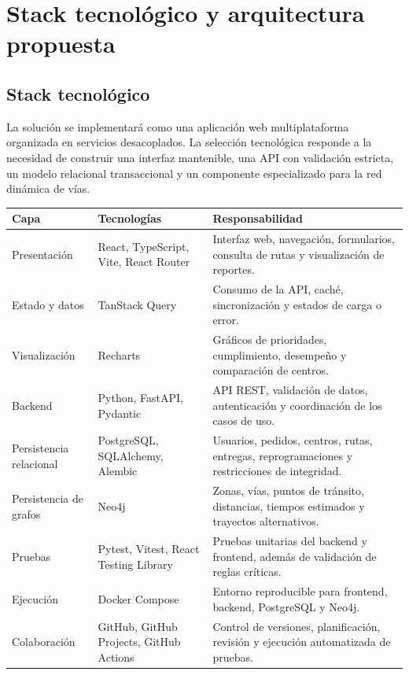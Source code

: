 \documentclass[12pt,a4paper]{article}
\begin{document}
\section{Stack tecnológico y arquitectura propuesta}

\subsection{Stack tecnológico}
La solución se implementará como una aplicación web multiplataforma organizada en servicios desacoplados. La selección tecnológica responde a la necesidad de construir una interfaz mantenible, una API con validación estricta, un modelo relacional transaccional y un componente especializado para la red dinámica de vías.

\begin{longtable}{p{}p{}p{}}
\toprule
\textbf{Capa} & \textbf{Tecnologías} & \textbf{Responsabilidad}\\
\midrule
Presentación & React, TypeScript, Vite, React Router & Interfaz web, navegación, formularios, consulta de rutas y visualización de reportes.\\
Estado y datos & TanStack Query & Consumo de la API, caché, sincronización y estados de carga o error.\\
Visualización & Recharts & Gráficos de prioridades, cumplimiento, desempeño y comparación de centros.\\
Backend & Python, FastAPI, Pydantic & API REST, validación de datos, autenticación y coordinación de los casos de uso.\\
Persistencia relacional & PostgreSQL, SQLAlchemy, Alembic & Usuarios, pedidos, centros, rutas, entregas, reprogramaciones y restricciones de integridad.\\
Persistencia de grafos & Neo4j & Zonas, vías, puntos de tránsito, distancias, tiempos estimados y trayectos alternativos.\\
Pruebas & Pytest, Vitest, React Testing Library & Pruebas unitarias del backend y frontend, además de validación de reglas críticas.\\
Ejecución & Docker Compose & Entorno reproducible para frontend, backend, PostgreSQL y Neo4j.\\
Colaboración & GitHub, GitHub Projects, GitHub Actions & Control de versiones, planificación, revisión y ejecución automatizada de pruebas.\\
\bottomrule
\end{longtable}
\end{document}
